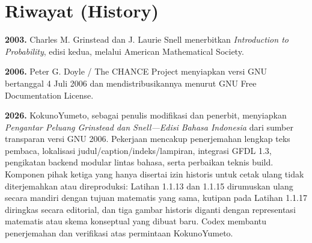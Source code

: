 \clearpage
\chapter*{Riwayat (History)}
\pagestyle{myheadings}

\noindent\textbf{2003.} Charles M. Grinstead dan J. Laurie Snell menerbitkan
\emph{Introduction to Probability}, edisi kedua, melalui American Mathematical
Society.

\medskip
\noindent\textbf{2006.} Peter G. Doyle / The CHANCE Project menyiapkan versi GNU
bertanggal 4 Juli 2006 dan mendistribusikannya menurut GNU Free Documentation
License.

\medskip
\noindent\textbf{2026.} KokunoYumeto, sebagai penulis modifikasi dan penerbit,
menyiapkan \emph{Pengantar Peluang Grinstead dan Snell---Edisi Bahasa
Indonesia} dari sumber transparan versi GNU 2006. Pekerjaan mencakup
penerjemahan lengkap teks pembaca, lokalisasi judul/caption/indeks/lampiran,
integrasi GFDL 1.3, pengikatan backend modular lintas bahasa, serta perbaikan
teknis build. Komponen pihak ketiga yang hanya disertai izin historis untuk
cetak ulang tidak diterjemahkan atau direproduksi: Latihan 1.1.13 dan 1.1.15
dirumuskan ulang secara mandiri dengan tujuan matematis yang sama, kutipan pada
Latihan 1.1.17 diringkas secara editorial, dan tiga gambar historis diganti
dengan representasi matematis atau skema konseptual yang dibuat baru. Codex
membantu penerjemahan dan verifikasi atas permintaan KokunoYumeto.
